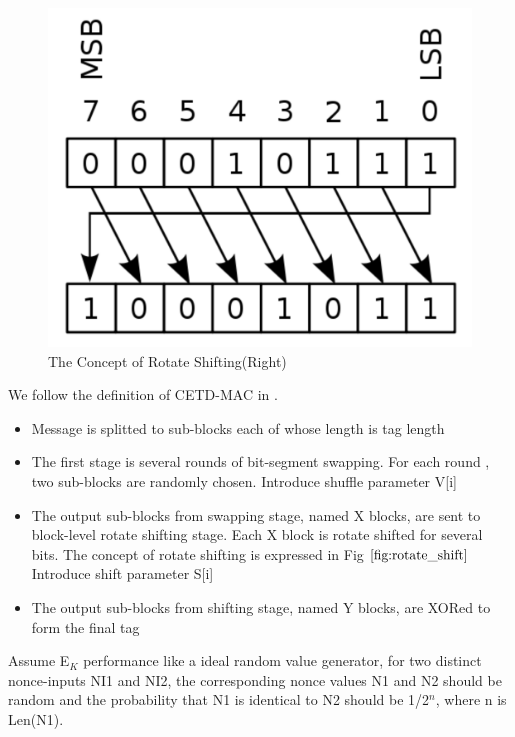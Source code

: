 \begin{figure}[htbp]
 \centering
 \includegraphics[scale=0.4]{./diagrams/rotate_right.pdf}
 \caption{The Concept of Rotate Shifting(Right)}
 \label{fig:rotate_shift}
\end{figure}
We follow the definition of CETD-MAC in \cite{keylist}. 
\begin{itemize}
	\item Message is splitted to sub-blocks each of whose length is tag length
	\item The first stage is several rounds of bit-segment swapping. For each round , two sub-blocks are randomly chosen. Introduce shuffle parameter V[i]
	\item The output sub-blocks from swapping stage, named X blocks, are sent to block-level rotate shifting stage. Each X block is rotate shifted for several bits. The concept of rotate shifting is expressed in Fig $\ref{fig:rotate_shift}$ Introduce shift parameter S[i]
	\item The output sub-blocks from shifting stage, named Y blocks, are XORed to form the final tag
\end{itemize}
Assume E$_K$ performance like a ideal random value generator, for two distinct nonce-inputs NI1 and NI2, the corresponding nonce values N1 and N2 should be random and the probability that N1 is identical to N2 should be 1/2$^n$, where n is Len(N1). 


